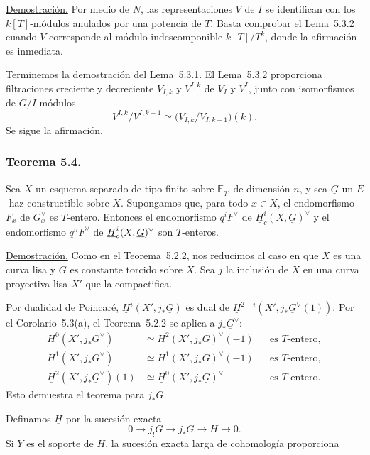 \noindent\underline{Demostración.}
Por medio de $N$, las representaciones $V$ de $I$ se identifican con los
$k[T]$-módulos anulados por una potencia de $T$. Basta comprobar el
Lema~5.3.2 cuando $V$ corresponde al módulo indescomponible
$k[T]/T^k$, donde la afirmación es inmediata.

Terminemos la demostración del Lema~5.3.1. El Lema~5.3.2 proporciona
filtraciones creciente y decreciente $V_{I,k}$ y $V^{I,k}$ de $V_I$ y
$V^I$, junto con isomorfismos de $G/I$-módulos
\[
V^{I,k}/V^{I,k+1}\simeq
\bigl(V_{I,k}/V_{I,k-1}\bigr)(k).
\]
Se sigue la afirmación.

\pageoriginale

\subsubsection*{Teorema 5.4.}
Sea $X$ un esquema separado de tipo finito sobre $\mathbb F_q$, de
dimensión $n$, y sea $\underline G$ un $E$-haz constructible sobre $X$.
Supongamos que, para todo $x\in X$, el endomorfismo $F_x$ de $G_x^\vee$
es $T$-entero. Entonces el endomorfismo $q^iF^\vee$ de
$\underline H_c^i(X,\underline G)^\vee$ y el endomorfismo $q^nF^\vee$ de
$\sisi{H}{\underline H}_c^i(X,\underline G)^\vee$ son $T$-enteros.

\noindent\underline{Demostración.}
Como en el Teorema~5.2.2, nos reducimos al caso en que $X$ es una curva
lisa y $\underline G$ es constante torcido sobre $X$. Sea $j$ la
inclusión de $X$ en una curva proyectiva lisa $X'$ que la compactifica.

Por dualidad de Poincaré, $\underline H^i(X',j_*\underline G)$ es dual de
$\underline H^{2-i}(X',j_*\underline G^\vee(1))$. Por el
Corolario~5.3(a), el Teorema~5.2.2 se aplica a
$j_*\underline G^\vee$:
\begin{align*}
\underline H^0(X',j_*\underline G^\vee)
&\simeq\underline H^2(X',j_*\underline G)^\vee(-1)
&&\text{es $T$-entero},\\
\underline H^1(X',j_*\underline G^\vee)
&\simeq\underline H^1(X',j_*\underline G)^\vee(-1)
&&\text{es $T$-entero},\\
\underline H^2(X',j_*\underline G^\vee)(1)
&\simeq\underline H^0(X',j_*\underline G)^\vee
&&\text{es $T$-entero}.
\end{align*}
Esto demuestra el teorema para $j_*\underline G$.

Definamos $\underline H$ por la sucesión exacta
\[
0\longrightarrow j_!\underline G\longrightarrow j_*\underline G
\longrightarrow\underline H\longrightarrow0.
\]
Si $Y$ es el soporte de $\underline H$, la sucesión exacta larga de
cohomología proporciona
\begin{center}
\end{center}


